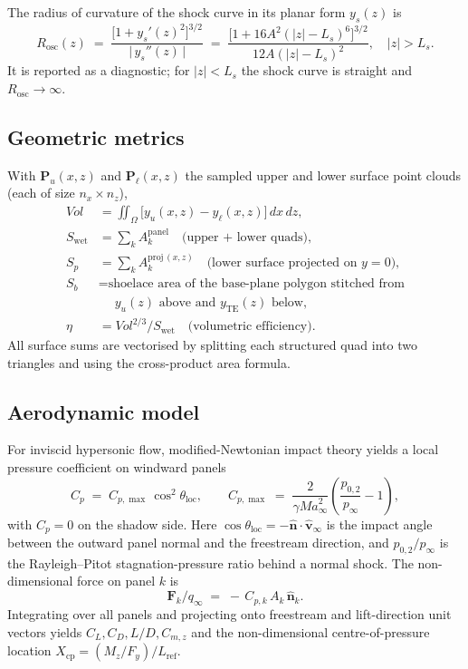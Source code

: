 \documentclass[11pt,a4paper]{article}
\newcommand{\Ma}{\mathit{Ma}}
\newcommand{\Vol}{\mathit{Vol}}
\newcommand{\Swet}{S_{\mathrm{wet}}}
\newcommand{\Sp}{S_{p}}
\newcommand{\Sb}{S_{b}}
\newcommand{\Ls}{L_{s}}
\begin{document}
The radius of curvature of the shock curve in its planar form
$y_{s}(z)$ is
\begin{equation}
 R_{\mathrm{osc}}(z) \;=\; \frac{\bigl[1 + y_{s}'(z)^{2}\bigr]^{3/2}}
                                {\bigl|\,y_{s}''(z)\,\bigr|}
                 \;=\; \frac{\bigl[1 + 16 A^{2}(|z|-\Ls)^{6}\bigr]^{3/2}}
                             {12 A (|z|-\Ls)^{2}}, \quad |z|>\Ls.
 \label{eq:Rosc}
\end{equation}
It is reported as a diagnostic; for $|z|<\Ls$ the shock curve is
straight and $R_{\mathrm{osc}}\to\infty$.

\subsection{Geometric metrics}

With $\mathbf{P}_{u}(x,z)$ and $\mathbf{P}_{\ell}(x,z)$ the sampled upper
and lower surface point clouds (each of size $n_{x}\times n_{z}$),
\begin{align}
 \Vol &= \iint_{\Omega} \bigl[y_{u}(x,z) - y_{\ell}(x,z)\bigr]\, dx\,dz, \\
 \Swet &= \sum_{k} A_{k}^{\mathrm{panel}}
          \quad\text{(upper + lower quads)},\\
 \Sp &= \sum_{k} A_{k}^{\mathrm{proj}\,(x,z)}
          \quad\text{(lower surface projected on $y=0$)},\\
 \Sb &= \text{shoelace area of the base-plane polygon stitched from}\\
     &\quad\;y_{u}(z) \text{ above and } y_{\mathrm{TE}}(z) \text{ below},\\
 \eta &= \Vol^{2/3}/\Swet \quad\text{(volumetric efficiency)}.
\end{align}
All surface sums are vectorised by splitting each structured quad into
two triangles and using the cross-product area formula.

\subsection{Aerodynamic model}

For inviscid hypersonic flow, modified-Newtonian impact theory yields
a local pressure coefficient on windward panels
\begin{equation}
 C_{p} \;=\; C_{p,\max}\,\cos^{2}\theta_{\text{loc}},
 \qquad
 C_{p,\max} \;=\; \frac{2}{\gamma \Ma_{\infty}^{2}}
                   \!\left(\frac{p_{0,2}}{p_{\infty}} - 1\right),
\end{equation}
with $C_{p}=0$ on the shadow side. Here $\cos\theta_{\text{loc}}=
-\hat{\mathbf{n}}\cdot\hat{\mathbf{v}}_{\infty}$ is the impact angle
between the outward panel normal and the freestream direction, and
$p_{0,2}/p_{\infty}$ is the Rayleigh--Pitot stagnation-pressure ratio
behind a normal shock. The non-dimensional force on panel $k$ is
\[
 \mathbf{F}_{k}/q_{\infty} \;=\; -\,C_{p,k}\,A_{k}\,\hat{\mathbf{n}}_{k}.
\]
Integrating over all panels and projecting onto freestream and
lift-direction unit vectors yields $C_{L}, C_{D}, L/D, C_{m,z}$ and the
non-dimensional centre-of-pressure location
$X_{\mathrm{cp}}=(M_{z}/F_{y})/L_{\mathrm{ref}}$.
\end{document}
